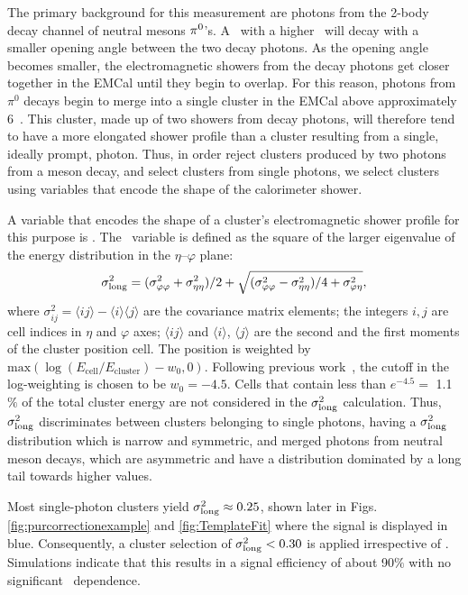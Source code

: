 The primary background for this measurement are photons from the 2-body decay channel of neutral mesons $\pi^0$'s. A \pizero~with a higher \pt~will decay  with a smaller opening angle between the two decay photons. As the opening angle becomes smaller, the electromagnetic showers from the decay photons get closer together in the EMCal until they begin to overlap. For this reason, photons from $\pi^0$ decays begin to merge into a single cluster in the EMCal above approximately 6~\GeVc. This cluster, made up of two showers from decay photons, will therefore tend to have a more elongated shower profile than a cluster resulting from a single, ideally prompt, photon. Thus, in order reject clusters produced by two photons from a meson decay, and select clusters from single photons, we select clusters using variables that encode the shape of the calorimeter shower. 

A variable that encodes the shape of a cluster's electromagnetic shower profile for this purpose is \lambdasquare. 
The \lambdasquare~variable is defined as the square of the larger eigenvalue of the energy distribution in the $\eta$--$\varphi$ plane:
\begin{equation}
\sigma^{2}_{\mathrm{long}} = (\sigma^{2}_{\varphi\varphi} + \sigma^{2}_{\eta\eta})/2 + \sqrt{(\sigma^{2}_{\varphi\varphi} - \sigma^{2}_{\eta\eta})/4 + \sigma^{2}_{\varphi\eta}},
\end{equation}
where $\sigma^{2}_{ij} = \langle ij \rangle - \langle i \rangle\langle j \rangle$ are the covariance matrix elements; the integers $i,j$ are cell indices in $\eta$ and  $\varphi$ axes; $\langle ij \rangle$ and $\langle i\rangle$, $\langle j\rangle$ are the second and the first moments of the cluster position cell. The position is weighted by $\mathrm{max}\left(\log(E_{\mathrm{cell}}/E_{\mathrm{cluster}}) - w_{0},0\right).$ Following previous work~\cite{Acharya:2018dqe}, the cutoff in the log-weighting is chosen to be $w_{0}=-4.5$. Cells that contain less than {$e^{-4.5} =$ 1.1$\%$} of the total cluster energy are not considered in the $\sigma^{2}_{\mathrm{long}}$ calculation. Thus, $\sigma^{2}_{\mathrm{long}}$ discriminates between clusters belonging to single photons, having a $\sigma^{2}_{\mathrm{long}}$ distribution which is narrow and symmetric, and merged photons from neutral meson decays, which are asymmetric and have a distribution dominated by a long tail towards higher values. 

Most single-photon clusters yield $\sigma^{2}_{\mathrm{long}}\approx 0.25$, shown later in Figs. \ref{fig:purcorrectionexample} and \ref{fig:TemplateFit} where the signal is displayed in blue. Consequently, a cluster selection of $\sigma^{2}_{\mathrm{long}}<0.30$ is applied irrespective of \pt. Simulations indicate that this results in a signal efficiency of about 90$\%$ with no significant \pt~dependence.


